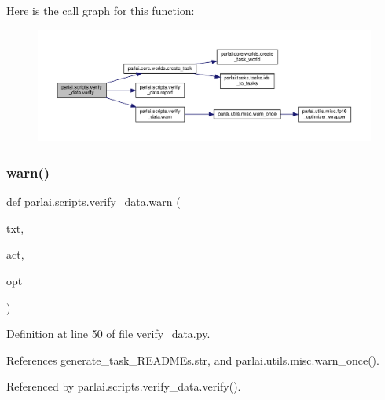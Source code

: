 Here is the call graph for this function\+:
\nopagebreak
\begin{figure}[H]
\begin{center}
\leavevmode
\includegraphics[width=350pt]{namespaceparlai_1_1scripts_1_1verify__data_acf6da63d62b2bf71c8fb7860e944a5bf_cgraph}
\end{center}
\end{figure}
\mbox{\label{namespaceparlai_1_1scripts_1_1verify__data_ab1f264e6d69b1abe3399ba05512f8c66}} 
\subsubsection{\texorpdfstring{warn()}{warn()}}
{\footnotesize\ttfamily def parlai.\+scripts.\+verify\+\_\+data.\+warn (\begin{DoxyParamCaption}\item[{}]{txt,  }\item[{}]{act,  }\item[{}]{opt }\end{DoxyParamCaption})}



Definition at line 50 of file verify\+\_\+data.\+py.



References generate\+\_\+task\+\_\+\+R\+E\+A\+D\+M\+Es.\+str, and parlai.\+utils.\+misc.\+warn\+\_\+once().



Referenced by parlai.\+scripts.\+verify\+\_\+data.\+verify().

